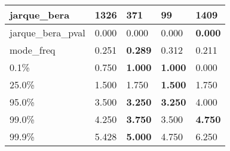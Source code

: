 \begin{table}[H]
\begin{tabular}{|l|m{10em}|m{10em}|m{10em}|m{10em}|}
\hline jarque\_bera & 1326 & 371 & \cellcolor[rgb]{0.9, 0.54, 0.52} 99 & \bfseries 1409 \\
\hline jarque\_bera\_pval & 0.000 & 0.000 & \cellcolor[rgb]{0.9, 0.54, 0.52} 0.000 & \bfseries 0.000 \\
\hline mode\_freq & 0.251 & \bfseries 0.289 & \cellcolor[rgb]{0.9, 0.54, 0.52} 0.312 & 0.211 \\
\hline 0.1\% & 0.750 & \bfseries 1.000 & \bfseries 1.000 & \cellcolor[rgb]{0.9, 0.54, 0.52} 0.000 \\
\hline 25.0\% & 1.500 & \cellcolor[rgb]{0.9, 0.54, 0.52} 1.750 & \bfseries 1.500 & \cellcolor[rgb]{0.9, 0.54, 0.52} 1.750 \\
\hline 95.0\% & 3.500 & \bfseries 3.250 & \bfseries 3.250 & \cellcolor[rgb]{0.9, 0.54, 0.52} 4.000 \\
\hline 99.0\% & 4.250 & \bfseries 3.750 & \cellcolor[rgb]{0.9, 0.54, 0.52} 3.500 & \bfseries 4.750 \\
\hline 99.9\% & 5.428 & \bfseries 5.000 & 4.750 & \cellcolor[rgb]{0.9, 0.54, 0.52} 6.250 \\
\hline
\end{tabular}
\end{table}
